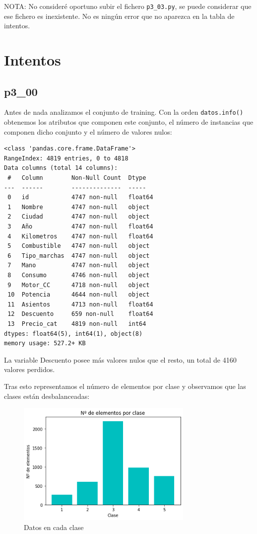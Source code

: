 \documentclass[a4]{article}
\begin{document}
\vspace{5mm}
NOTA: No consideré oportuno subir el fichero \texttt{p3\_03.py}, se puede considerar que ese fichero es inexistente. No es ningún error que no aparezca en la tabla de intentos.

\newpage
\section{Intentos}

\subsection{p3\_00}

Antes de nada analizamos el conjunto de training. Con la orden \texttt{datos.info()} obtenemos los atributos que componen este conjunto, el número de instancias que componen dicho conjunto y el número de valores nulos:

\begin{verbatim}
<class 'pandas.core.frame.DataFrame'>
RangeIndex: 4819 entries, 0 to 4818
Data columns (total 14 columns):
 #   Column        Non-Null Count  Dtype  
---  ------        --------------  -----  
 0   id            4747 non-null   float64
 1   Nombre        4747 non-null   object 
 2   Ciudad        4747 non-null   object 
 3   Año           4747 non-null   float64
 4   Kilometros    4747 non-null   float64
 5   Combustible   4747 non-null   object 
 6   Tipo_marchas  4747 non-null   object 
 7   Mano          4747 non-null   object 
 8   Consumo       4746 non-null   object 
 9   Motor_CC      4718 non-null   object 
 10  Potencia      4644 non-null   object 
 11  Asientos      4713 non-null   float64
 12  Descuento     659 non-null    float64
 13  Precio_cat    4819 non-null   int64  
dtypes: float64(5), int64(1), object(8)
memory usage: 527.2+ KB
\end{verbatim}

La variable Descuento posee más valores nulos que el resto, un total de 4160 valores perdidos.

Tras esto representamos el número de elementos por clase y observamos que las clases están desbalanceadas:

\begin{figure}[H]
  \centering
  \caption{Datos en cada clase}
  \includegraphics[width=85mm]{imagenes/count}
\end{figure}
\end{document}
